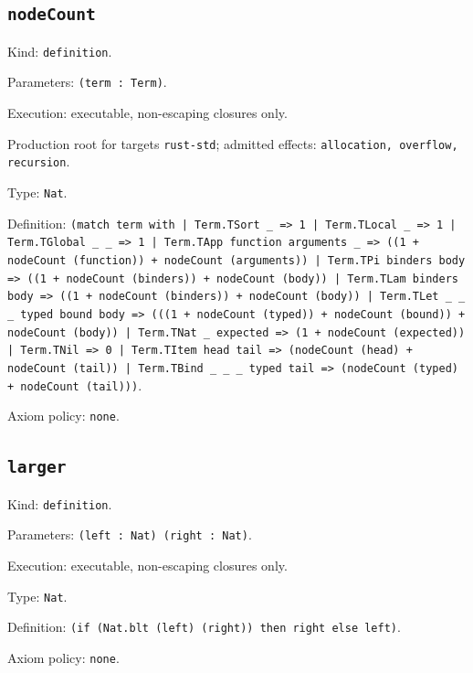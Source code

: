 \documentclass[11pt]{article}
\begin{document}
\subsection*{\texttt{nodeCount}}
\noindent Kind: \texttt{definition}.\par
\noindent Parameters: \texttt{(term : Term)}.\par
\noindent Execution: executable, non-escaping closures only.\par
\noindent Production root for targets \texttt{rust-std}; admitted effects: \texttt{allocation, overflow, recursion}.\par
\noindent Type: \texttt{Nat}.\par
\noindent Definition: \texttt{(match term with | Term.TSort \_ => 1 | Term.TLocal \_ => 1 | Term.TGlobal \_ \_ => 1 | Term.TApp function arguments \_ => ((1 + nodeCount (function)) + nodeCount (arguments)) | Term.TPi binders body => ((1 + nodeCount (binders)) + nodeCount (body)) | Term.TLam binders body => ((1 + nodeCount (binders)) + nodeCount (body)) | Term.TLet \_ \_ \_ typed bound body => (((1 + nodeCount (typed)) + nodeCount (bound)) + nodeCount (body)) | Term.TNat \_ expected => (1 + nodeCount (expected)) | Term.TNil => 0 | Term.TItem head tail => (nodeCount (head) + nodeCount (tail)) | Term.TBind \_ \_ \_ typed tail => (nodeCount (typed) + nodeCount (tail)))}.\par
\noindent Axiom policy: \texttt{none}.\par
\subsection*{\texttt{larger}}
\noindent Kind: \texttt{definition}.\par
\noindent Parameters: \texttt{(left : Nat) (right : Nat)}.\par
\noindent Execution: executable, non-escaping closures only.\par
\noindent Type: \texttt{Nat}.\par
\noindent Definition: \texttt{(if (Nat.blt (left) (right)) then right else left)}.\par
\noindent Axiom policy: \texttt{none}.\par
\end{document}
